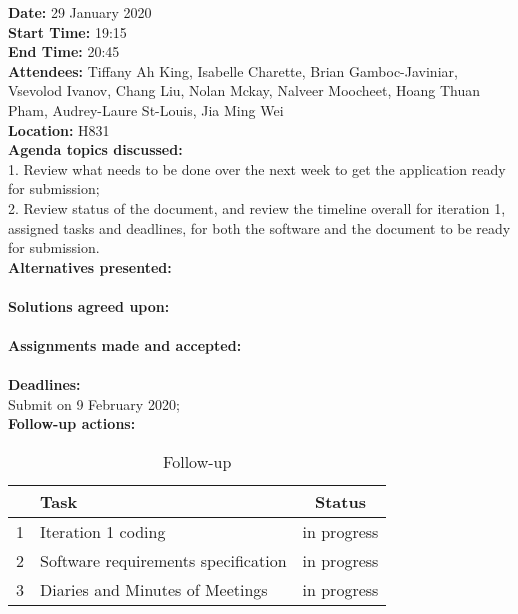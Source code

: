 \documentclass[12pt]{article}
\begin{document}
\newpage
{\bf Date:} 29 January 2020\\
{\bf Start Time:} 19:15\\
{\bf End Time:}  20:45\\
{\bf Attendees:} Tiffany Ah King,
Isabelle Charette,
Brian Gamboc-Javiniar,
Vsevolod Ivanov,
Chang Liu,
Nolan Mckay,
Nalveer Moocheet,
Hoang Thuan Pham,
Audrey-Laure St-Louis,
Jia Ming Wei\\
{\bf Location:} H831 \\
{\bf Agenda topics discussed:} \\1. Review what needs to be done over the next week to get the application ready for submission; \\2. Review status of the document, and review the timeline overall for iteration 1, assigned tasks and deadlines, for both the software and the document to be ready for submission.\\
{\bf Alternatives presented:} \\ \\
{\bf Solutions agreed upon:} \\ \\
{\bf Assignments made and accepted:} \\ \\
{\bf Deadlines:} \\Submit on 9 February 2020; \\
{\bf Follow-up actions:} \\
\begin{table}[h!]
\centering
 \begin{tabular}{||l l c ||} 
 \hline
   & Task & Status\\ [0.5ex] 
 \hline\hline
 1 & Iteration 1 coding & in progress \\ 
 2 & Software requirements specification &  in progress\\
 3 & Diaries and Minutes of Meetings &  in progress\\[1ex] 

 \hline
 \end{tabular}
\caption{Follow-up }
\label{table:1}
\end{table}
\end{document}
